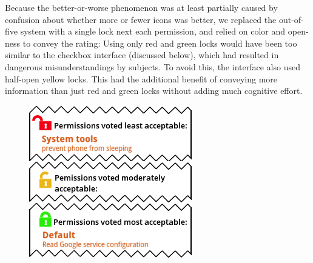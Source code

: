 \documentclass[11pt]{article}
\newcommand{\refsec}[1]{Section~\ref{#1}}
\begin{document}
Because the better-or-worse phenomenon was at least partially caused 
by confusion about whether more or fewer icons was better, we 
replaced the out-of-five system with 
a single lock next each permission, and relied on 
color and open-ness to convey the rating:
\label{ss-sec-locks-r3}
Using
only red and green locks would have been too similar to the checkbox
interface (discussed below),
which had resulted in dangerous misunderstandings by subjects. 
To avoid this, the interface also used half-open yellow 
locks. This 
had the additional benefit of conveying more 
information than just red and green locks without adding much cognitive 
effort.

\newpage

\begin{figure}
\begin{center}
\includegraphics[width=.9\linewidth]{candidate-img/locks/locksR4.png}
\end{center}
\end{figure}
\end{document}
